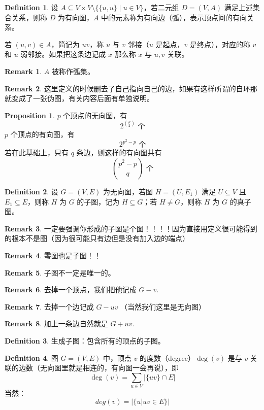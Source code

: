 \documentclass[oneside]{book}
\theoremstyle{definition}
\newtheorem{proposition}{Proposition}[section]
\newtheorem{definition}{Definition}[section]
\newtheorem{remark}{Remark}[section]
\begin{document}
\begin{definition}
	设 \( A \subseteq V \times V \setminus \{\{u, u\} \mid u \in V\} \)，若二元组 \( D = (V, A) \) 满足上述集合关系，则称 \( D \) 为有向图，\( A \) 中的元素称为有向边（弧），表示顶点间的有向关系。
	
	若 \( (u, v) \in A \)，简记为 \( uv \)，称 \( u \) 与 \( v \) 邻接（\( u \) 是起点，\( v \) 是终点），对应的称 \(v\) 和 \(u\) 弱邻接。如果把这条边记成 \(x\) 那么称 \( x \) 与 \( u, v \) 关联。
\end{definition}
\begin{remark}
	\(A\) 被称作弧集。
\end{remark}
\begin{remark}
	这里定义的时候删去了自己指向自己的边，如果有这样所谓的自环那就变成了一张伪图，有关内容后面有单独说明。
\end{remark}
\begin{proposition}
	\( p \) 个顶点的无向图，有
	\[2^{\binom{p}{2}}\text{ 个}\]
	\( p \) 个顶点的有向图，有
	\[2^{p^2-p}\text{ 个}\]
		若在此基础上，只有 \( q \) 条边，则这样的有向图共有 \[\binom{p^2 - p}{q}\text{ 个}\]
\end{proposition}
\begin{definition}
	设 \( G = (V, E) \) 为无向图，若图 \( H = (U, E_1) \) 满足 \( U \subseteq V \) 且 \( E_1 \subseteq E \)，则称 \( H \) 为 \( G \) 的子图，记为 \( H \subseteq G \)；若 \( H \neq G \)，则称 \( H \) 为 \( G \) 的真子图。
\end{definition}
\begin{remark}
	一定要强调你形成的子图是个图！！！！因为直接用定义很可能得到的根本不是图（因为很可能只有边但是没有加入边的端点）
\end{remark}
\begin{remark}
	零图也是子图！！
\end{remark}
\begin{remark}
	子图不一定是唯一的。
\end{remark}
\begin{remark}
	去掉一个顶点，我们把他记成 \(G-v\).
\end{remark}
\begin{remark}
	去掉一个边记成 \(G-uv\) （当然我们这里是无向图）
\end{remark}
\begin{remark}
	加上一条边自然就是 \(G+uv\).
\end{remark}
\begin{definition}
	生成子图：包含所有的顶点的子图。
\end{definition}
\begin{definition}
	图 \( G=(V,E) \) 中，顶点 \( v \) 的度数（degree）\( \deg(v) \) 是与 \( v \) 关联的边数（无向图里就是相连的，有向图一会再说），即 \[ \deg(v) = \sum_{u\in V} \left| \{uv\} \cap E \right| \]
	当然：
	\[deg(v)=\big|\{u|uv\in E\}\big|\]
\end{definition}
\end{document}
